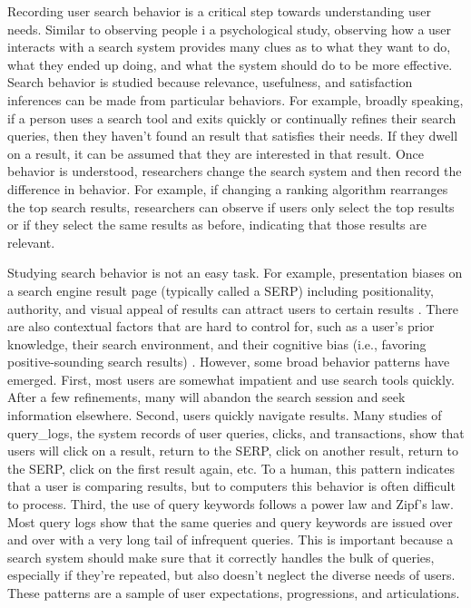 Recording user search behavior is a critical step towards understanding user needs. Similar to observing people i a psychological study, observing how a user interacts with a search system provides many clues as to what they want to do, what they ended up doing, and what the system should do to be more effective. Search behavior is studied because relevance, usefulness, and satisfaction inferences can be made from particular behaviors. For example, broadly speaking, if a person uses a search tool and exits quickly or continually refines their search queries, then they haven't found an result that satisfies their needs. If they dwell on a result, it can be assumed that they are interested in that result. Once behavior is understood, researchers change the search system and then record the difference in behavior. For example, if changing a ranking algorithm rearranges the top search results, researchers can observe if users only select the top results or if they select the same results as before, indicating that those results are relevant.

Studying search behavior is not an easy task. For example, presentation biases on a search engine result page (typically called a \acrshort{SERP}) including positionality, authority, and visual appeal of results can attract users to certain results \cite{Hofmann2016}. There are also contextual factors that are hard to control for, such as a user's prior knowledge, their search environment, and their cognitive bias (i.e., favoring positive-sounding search results) \cite{Hofmann2016}. However, some broad behavior patterns have emerged. First, most users are somewhat impatient and use search tools quickly. After a few refinements, many will abandon the search session and seek information elsewhere. Second, users quickly navigate results. Many studies of \gls{query_logs}, the system records of user queries, clicks, and transactions, show that users will click on a result, return to the SERP, click on another result, return to the SERP, click on the first result again, etc. To a human, this pattern indicates that a user is comparing results, but to computers this behavior is often difficult to process. Third, the use of query keywords follows a power law and Zipf's law. Most query logs show that the same queries and query keywords are issued over and over with a very long tail of infrequent queries. This is important because a search system should make sure that it correctly handles the bulk of queries, especially if they're repeated, but also doesn't neglect the diverse needs of users. These patterns are a sample of user expectations, progressions, and articulations.


